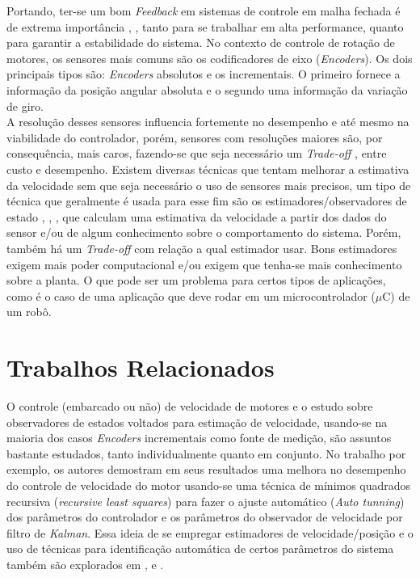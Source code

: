 Portando, ter-se um bom \emph{Feedback} em sistemas de controle em malha fechada é de extrema importância \cite{analise_incr_enc}, \cite{simple_speed_feedback}, tanto para se trabalhar em alta performance, quanto para garantir a estabilidade do sistema. No contexto de controle de rotação de motores, os sensores mais comuns são os codificadores de eixo (\emph{Encoders}). Os dois principais tipos são: \emph{Encoders} absolutos e os incrementais. O primeiro fornece a informação da posição angular absoluta e o segundo uma informação da variação de giro. \\

A resolução desses sensores influencia fortemente no desempenho e até mesmo na viabilidade do controlador, porém, sensores com resoluções maiores são, por consequência, mais caros, fazendo-se que seja necessário um \emph{Trade-off} \cite{analise_incr_enc}, \cite{low_precision_encoder01} entre custo e desempenho. Existem diversas técnicas que tentam melhorar a estimativa da velocidade sem que seja necessário o uso de sensores mais precisos, um tipo de técnica que geralmente é usada para esse fim são os estimadores/observadores de estado \cite{analise_incr_enc}, \cite{speed_observer_IA}, \cite{observer_speed}, que calculam uma estimativa da velocidade a partir dos dados do sensor e/ou de algum conhecimento sobre o comportamento do sistema. Porém, também há um \emph{Trade-off} com relação a qual estimador usar. Bons estimadores exigem mais poder computacional e/ou exigem que tenha-se mais conhecimento sobre a planta. O que pode ser um problema para certos tipos de aplicações, como é o caso de uma aplicação que deve rodar em um microcontrolador ($\mu$C) de um robô.\\

\section{Trabalhos Relacionados}
\label{sec:trabalhos_relacionados}

O controle (embarcado ou não) de velocidade de motores e o estudo sobre observadores de estados voltados para estimação de velocidade, usando-se na maioria dos casos \emph{Encoders} incrementais como fonte de medição, são assuntos bastante estudados, tanto individualmente quanto em conjunto. No trabalho \cite{low_precision_encoder01} por exemplo, os autores demostram em seus resultados uma melhora no desempenho do controle de velocidade do motor usando-se uma técnica de mínimos quadrados recursiva (\emph{recursive least squares}) para fazer o ajuste automático (\emph{Auto tunning}) dos parâmetros do controlador e os parâmetros do observador de velocidade por filtro de \emph{Kalman}. Essa ideia de se empregar estimadores de velocidade/posição e o uso de técnicas para identificação automática de certos parâmetros do sistema também são explorados em \cite{LOW_SPEED_CONTROL}, \cite{Y_HORI_01} e \cite{Y_HORI_02}.\\

